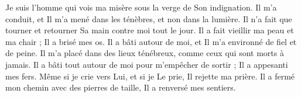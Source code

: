 Je suis l'homme qui vois ma misère sous la verge de Son indignation.
\versseparator
Il m'a conduit, et Il m'a mené dans les ténèbres, et non dans la lumière.
\versseparator
Il n'a fait que tourner et retourner Sa main contre moi tout le jour.
\versseparator
Il a fait vieillir ma peau et ma chair ; Il a brisé mes os.
\versseparator
Il a bâti autour de moi, et Il m'a environné de fiel et de peine.
\versseparator
Il m'a placé dans des lieux ténébreux, comme ceux qui sont morts à jamais.
\versseparator
Il a bâti tout autour de moi pour m'empêcher de sortir ; Il a appesanti mes fers.
\versseparator
Même si je crie vers Lui, et si je Le prie, Il rejette ma prière.
\versseparator
Il a fermé mon chemin avec des pierres de taille, Il a renversé mes sentiers.